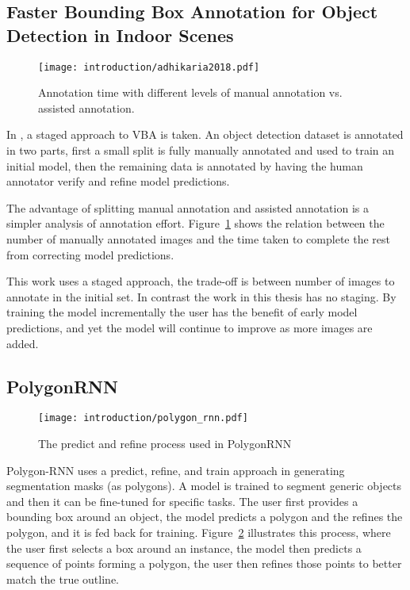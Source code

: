 \subsection{Faster Bounding Box Annotation for Object Detection in Indoor Scenes}

\begin{figure}[h]
  \centering
  \texttt{[image: introduction/adhikaria2018.pdf]}
  \caption{Annotation time with different levels of manual annotation vs. assisted annotation. \cite{Adhikaria2018}}  
  \label{fig:adhikaria2018}
\end{figure}

In \cite{Adhikaria2018}, a staged approach to \gls{VBA} is taken. An object detection dataset is annotated in two parts, first a small split is fully manually annotated and used to train an initial model, then the remaining data is annotated by having the human annotator verify and refine model predictions. 


The advantage of splitting manual annotation and assisted annotation is a simpler analysis of annotation effort. Figure~\ref{fig:adhikaria2018} shows the relation between the number of manually annotated images and the time taken to complete the rest from correcting model predictions.

This work uses a staged approach, the trade-off is between number of images to annotate in the initial set. In contrast the work in this thesis has no staging. By training the model incrementally the user has the benefit of early model predictions, and yet the model will continue to improve as more images are added.

\subsection {PolygonRNN \cite{Castrejon2017}}

\begin{figure}[h]
  \centering
  \texttt{[image: introduction/polygon\_rnn.pdf]}
  \caption{The predict and refine process used in PolygonRNN \cite{Castrejon2017}}  
  \label{fig:polygon_rnn}
\end{figure}


Polygon-RNN \cite{Castrejon2017} uses a predict, refine, and train approach in generating segmentation masks (as polygons). A model is trained to segment generic objects and then it can be fine-tuned for specific tasks. The user first provides a bounding box around an object, the model predicts a polygon and the refines the polygon, and it is fed back for training. Figure~\ref{fig:polygon_rnn} illustrates this process, where the user first selects a box around an instance, the model then predicts a sequence of points forming a polygon, the user then refines those points to better match the true outline.

